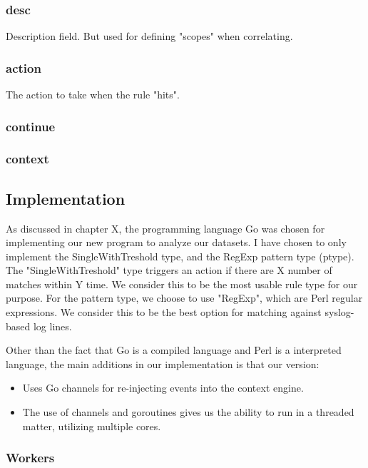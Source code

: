 \subsubsection{desc}
Description field. But used for defining "scopes" when correlating.

\subsubsection{action}
The action to take when the rule "hits".

\subsubsection{continue}

\subsubsection{context}

\subsection{Implementation}
As discussed in chapter X, the programming language Go was chosen for implementing our new program to analyze our datasets. I have chosen to only implement the SingleWithTreshold type, and the RegExp pattern type (ptype). The "SingleWithTreshold" type triggers an action if there are X number of matches within Y time. We consider this to be the most usable rule type for our purpose.  For the pattern type, we choose to use "RegExp", which are Perl regular expressions. We consider this to be the best option for matching against syslog-based log lines.

Other than the fact that Go is a compiled language and Perl is a interpreted language, the main additions in our implementation is that our version:
\begin{itemize}
    \item Uses Go channels for re-injecting events into the context engine.
    \item The use of channels and goroutines gives us the ability to run in a threaded matter, utilizing multiple cores.
\end{itemize}

\subsubsection{Workers}

